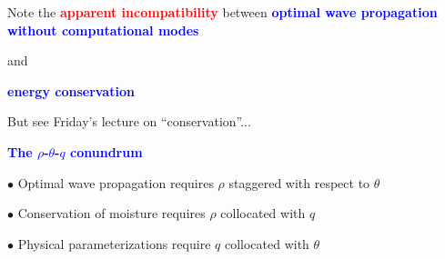 \documentclass[a4]{seminar}
\newcommand{\R}[1]{\textcolor{red}{#1}}
\newcommand{\B}[1]{\textcolor{blue}{#1}}
\begin{document}
\begin{slide}

\begin{center}
\end{center}

\end{slide}


\begin{slide}

Note the \R{\bf apparent incompatibility} between
\B{\bf optimal wave propagation without computational modes}

\vspace{3mm}

and

\vspace{3mm}

\B{\bf energy conservation}

\vspace{5mm}

But see Friday's lecture on ``conservation''...




\end{slide}


\begin{slide}

\B{\bf The \( \rho \)-\( \theta \)-\( q \) conundrum}

\vspace{3mm}

\( \bullet \) Optimal wave propagation requires \( \rho \) staggered
with respect to \( \theta \)

\vspace{2mm}

\( \bullet \) Conservation of moisture requires \( \rho \) collocated
with \( q \)

\vspace{2mm}

\( \bullet \) Physical parameterizations require \( q \) collocated
with \( \theta \)



\end{slide}

\end{document}
